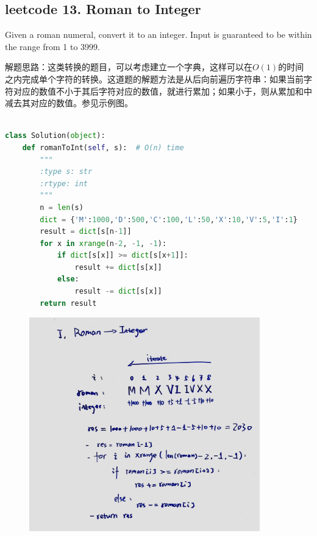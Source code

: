 \documentclass[a4paper,10pt]{article}
\begin{document}
\subsection{leetcode 13. Roman to Integer}
Given a roman numeral, convert it to an integer. Input is guaranteed to be within the range from 1 to 3999. \\

\begin{CJK*}{UTF8}{gbsn}
\noindent 解题思路：这类转换的题目，可以考虑建立一个字典，这样可以在$O(1)$的时间之内完成单个字符的转换。这道题的解题方法是从后向前遍历字符串：如果当前字符对应的数值不小于其后字符对应的数值，就进行累加；如果小于，则从累加和中减去其对应的数值。参见示例图。\\
\end{CJK*}

\begin{lstlisting}[language=Python, caption=Problem13. Roman to Integer]

class Solution(object):
    def romanToInt(self, s):  # O(n) time
        """
        :type s: str
        :rtype: int
        """
        n = len(s)
        dict = {'M':1000,'D':500,'C':100,'L':50,'X':10,'V':5,'I':1}
        result = dict[s[n-1]]
        for x in xrange(n-2, -1, -1):
            if dict[s[x]] >= dict[s[x+1]]:
                result += dict[s[x]]
            else:
                result -= dict[s[x]]
        return result
\end{lstlisting}

\begin{figure}[h]
    \includegraphics[width=10cm]{leetcode13.jpg}
    \centering\\
\end{figure}
\end{document}
